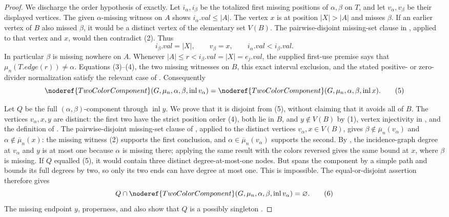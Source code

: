 \begin{proof}
We discharge the order hypothesis of  exactly.
Let \(i_\alpha,i_\beta\) be the totalized first missing positions of
\(\alpha,\beta\) on \(T\), and let \(v_\alpha,v_\beta\) be their displayed
vertices.  The given \(\alpha\)-missing witness on \(A\) shows
\(i_\alpha.\mathit{val}\le |A|\).  The vertex \(x\) is at position
\(|X|>|A|\) and misses \(\beta\).  If an earlier vertex of \(B\) also
missed \(\beta\), it would be a distinct vertex of the elementary set
\(V(B)\).  The pairwise-disjoint missing-set clause in
, applied to that vertex and \(x\),
would then contradict (2).  Thus
\[
 i_\beta.\mathit{val}=|X|,\qquad v_\beta=x,\qquad
 i_\alpha.\mathit{val}<i_\beta.\mathit{val}.                \tag{4}
\]
In particular \(\beta\) is missing nowhere on \(A\).  Whenever
\(|A|\le r<i_\beta.\mathit{val}=|X|=e_j.\mathit{val}\), the supplied
first-use premise says that
\(\mu_n(T.\mathit{edge}(r))\ne\alpha\).  Equations (3)--(4), the two
missing witnesses on \(B\), this exact interval exclusion, and the stated
positive- or zero-divider normalization satisfy the relevant case of
.  Consequently
\[
 \noderef{TwoColorComponent}(G,\mu_n,\alpha,\beta,
        \operatorname{inl}v_\alpha)
 =
 \noderef{TwoColorComponent}(G,\mu_n,\alpha,\beta,
        \operatorname{inl}x).                               \tag{5}
\]

Let \(Q\) be the full \((\alpha,\beta)\)-component through
\(\operatorname{inl}y\).  We prove that it is disjoint from (5), without
claiming that it avoids all of \(B\).  The vertices
\(v_\alpha,x,y\) are distinct: the first two have the strict position
order (4), both lie in \(B\), and \(y\notin V(B)\) by (1), vertex
injectivity in , and the definition of
.  The pairwise-disjoint missing-set clause
of , applied to the distinct vertices
\(v_\alpha,x\in V(B)\), gives
\(\beta\notin\overline\mu_n(v_\alpha)\) and
\(\alpha\notin\overline\mu_n(x)\): the missing witness (2) supports the
first conclusion, and
\(\alpha\in\overline\mu_n(v_\alpha)\) supports the second.  By
, the incidence-graph degree at
\(v_\alpha\) and \(y\) is at most one because \(\alpha\) is missing
there; applying the same result with the colors reversed gives the same
bound at \(x\), where \(\beta\) is missing.  If \(Q\) equalled (5), it
would contain three distinct degree-at-most-one nodes.  But
 spans the component by a simple
path and  bounds its full
degrees by two, so only its two ends can have degree at most one.  This
is impossible.  The equal-or-disjoint assertion
 therefore gives
\[
 Q\cap\noderef{TwoColorComponent}
   (G,\mu_n,\alpha,\beta,\operatorname{inl}v_\alpha)
   =\varnothing.                                             \tag{6}
\]
The missing endpoint \(y\), properness, and
 also show that \(Q\) is a
possibly singleton .


\end{proof}
